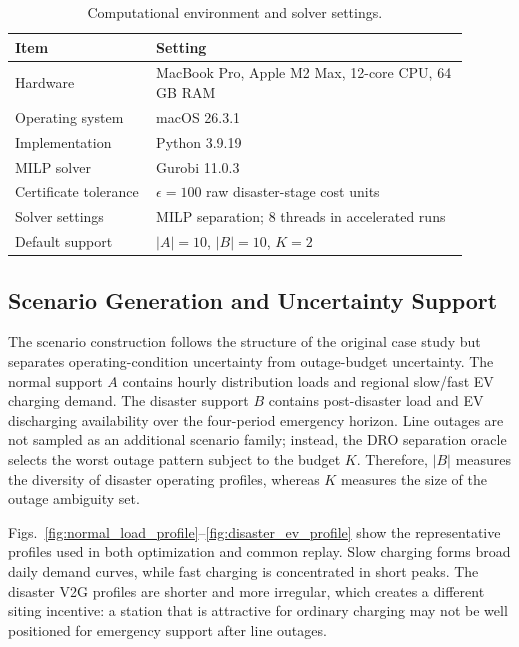 \begin{table}[!b]
\centering
\caption{Main model parameters in the default case study.}
\label{tab:setup_parameters}

\end{table}

\begin{table}[!b]
\centering
\caption{Computational environment and solver settings.}
\label{tab:computing_environment}
\footnotesize
\begin{tabular}{p{0.28\linewidth}p{0.62\linewidth}}
\toprule
Item & Setting \\
\midrule
Hardware & MacBook Pro, Apple M2 Max, 12-core CPU, 64 GB RAM \\
Operating system & macOS 26.3.1 \\
Implementation & Python 3.9.19 \\
MILP solver & Gurobi 11.0.3 \\
Certificate tolerance & $\epsilon=100$ raw disaster-stage cost units \\
Solver settings & MILP separation; 8 threads in accelerated runs \\
Default support & $|A|=10$, $|B|=10$, $K=2$ \\
\bottomrule
\end{tabular}
\end{table}

\subsection{Scenario Generation and Uncertainty Support}
The scenario construction follows the structure of the original case study but
separates operating-condition uncertainty from outage-budget uncertainty. The
normal support $A$ contains hourly distribution loads and regional slow/fast EV
charging demand. The disaster support $B$ contains post-disaster load and EV
discharging availability over the four-period emergency horizon. Line outages
are not sampled as an additional scenario family; instead, the DRO separation
oracle selects the worst outage pattern subject to the budget $K$. Therefore,
$|B|$ measures the diversity of disaster operating profiles, whereas $K$
measures the size of the outage ambiguity set.

Figs.~\ref{fig:normal_load_profile}--\ref{fig:disaster_ev_profile} show the
representative profiles used in both optimization and common replay. Slow
charging forms broad daily demand curves, while fast charging is concentrated
in short peaks. The disaster V2G profiles are shorter and more irregular,
which creates a different siting incentive: a station that is attractive for
ordinary charging may not be well positioned for emergency support after line
outages.


